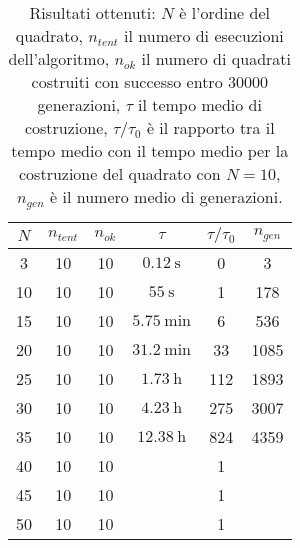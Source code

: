 \documentclass[italian,twoside,twocolumn]{article}
\begin{document}
\begin{table}[htbp]
	\centering
	\caption{Risultati ottenuti: $ N $ è l'ordine del quadrato, $ n_{tent} $ il numero di esecuzioni dell'algoritmo, $ n_{ok} $ il numero di quadrati costruiti con successo entro $ \num{30000} $ generazioni, $ \tau $ il tempo medio di costruzione, $ \tau \slash \tau_0 $ è il rapporto tra il tempo medio con il tempo medio per la costruzione del quadrato con $ N = 10 $, $ n_{gen} $ è il numero medio di generazioni.}
\begin{tabular}{c|ccccc}
	\hline
	$ N $ & $ n_{tent} $ & $ n_{ok} $ &        $ \tau $        & $ \tau \slash \tau_0 $ & $ n_{gen} $ \\ \hline
	  3   &      10      &     10     & $ \SI{0.12}{\second} $ &           0            &      3      \\
	 10   &      10      &     10     &  $ \SI{55}{\second} $  &           1            &     178     \\
	 15   &      10      &     10     & $ \SI{5.75}{\minute} $ &           6            &     536     \\
	 20   &      10      &     10     & $ \SI{31.2}{\minute} $ &           33           &    1085     \\
	 25   &      10      &     10     &  $ \SI{1.73}{\hour} $  &          112           &    1893     \\
	 30   &      10      &     10     &  $ \SI{4.23}{\hour} $  &          275           &    3007     \\
	 35   &      10      &     10     & $ \SI{12.38}{\hour} $  &          824           &    4359     \\
	 40   &      10      &     10     &                        &           1            &  \\
	 45   &      10      &     10     &                        &           1            &  \\
	 50   &      10      &     10     &                        &           1            &  \\ \hline
\end{tabular} 
\label{tab:risultati_xie_kang}
\end{table}
\end{document}
